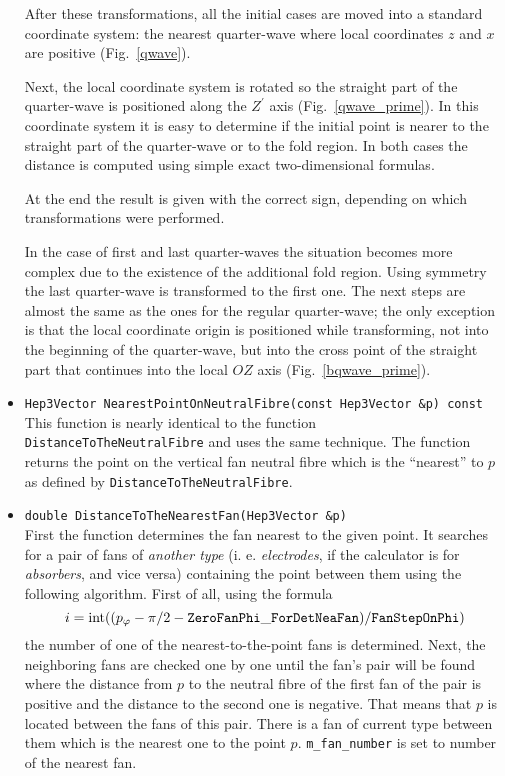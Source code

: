 \documentclass{article}
\begin{document}
\begin{itemize}
After these transformations, all the initial cases are moved into a
standard coordinate system: the nearest quarter-wave where
local coordinates $z$ and $x$ are positive (Fig.~\ref{qwave}).



Next, the local coordinate system is rotated so the straight part of the quarter-wave
is positioned along the $Z^{\prime}$ axis (Fig.~\ref{qwave_prime}).
In this coordinate system it is easy to determine if the initial point is
nearer to
the straight part of the quarter-wave or to the fold region. In both cases the
distance is computed using simple exact two-dimensional formulas.

At the end the result is given with the correct sign, depending on
which transformations were performed.



In the case of first and last quarter-waves the situation becomes more complex
due to
the existence of the additional fold region.
Using symmetry the last quarter-wave is transformed to the first one.
The next steps are almost the same as the ones for the regular quarter-wave;
the only
exception is that the local coordinate origin is positioned while transforming, not
into
the beginning of the quarter-wave, but into the cross point of the straight part
that continues into the local $OZ$ axis (Fig.~\ref{bqwave_prime}). 

\item {\tt Hep3Vector NearestPointOnNeutralFibre(const Hep3Vector \&p) const}\\
This function is nearly identical to the function {\tt
DistanceToTheNeutralFibre}
and uses the same technique.
 The function returns the point on the
vertical fan neutral fibre which is the ``nearest'' to $p$ as defined by
{\tt DistanceToTheNeutralFibre}.

\item {\tt double DistanceToTheNearestFan(Hep3Vector \&p)}\\
First the function determines the fan nearest to the given point.
It searches for a pair of fans of {\em another type} (i. e. {\em electrodes},
if the calculator is for {\em absorbers}, and vice versa)
containing the point between them using the following algorithm.
First of all, using the formula
\[i = \mbox{int}((p_{\varphi} - \pi/2 - {\tt ZeroFanPhi\_ForDetNeaFan}) /
{\tt FanStepOnPhi})\] 
the number of one of the nearest-to-the-point fans is determined.
Next, the neighboring fans are checked one by one until the fan's pair will be
found where the distance from $p$ to the neutral fibre of the first fan of the
pair is positive and the distance to the second one is negative.
That means that $p$ is located between the fans of this pair. There is a fan
of current type between them which is the nearest one to the point $p$.
{\tt m\_fan\_number} is set to number of the nearest fan.


\end{itemize}
\end{document}
